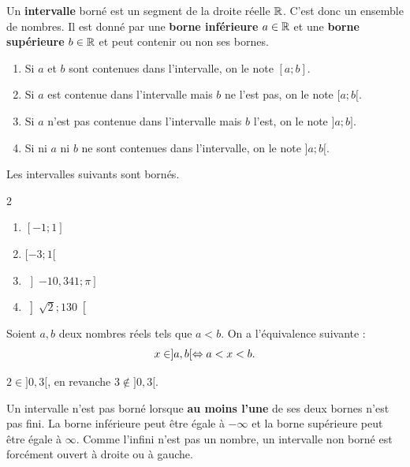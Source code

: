 \documentclass[a4paper, 12pt]{report}
\begin{document}
\begin{defn}
	Un \textbf{intervalle} borné est un segment de la droite réelle $\mathbb{R}$. C'est donc un ensemble de nombres.
	Il est donné par une \textbf{borne inférieure} $a \in \mathbb{R}$ et une \textbf{borne supérieure} $b\in\mathbb{R}$ et peut contenir ou non ses bornes.
	
	\begin{enumerate}
		\item Si $a$ et $b$ sont contenues dans l'intervalle, on le note $[a ; b]$.
		\item Si $a$  est contenue dans l'intervalle mais $b$ ne l'est pas, on le note $[a ; b [$.
		\item Si $a$ n'est pas contenue dans l'intervalle mais $b$ l'est, on le note $] a ; b]$.
		\item Si ni $a$ ni $b$ ne sont contenues dans l'intervalle, on le note $] a ; b [$.
	\end{enumerate}
\end{defn}

\begin{ex}
Les intervalles suivants sont bornés.
	\begin{multicols}{2}
	\begin{enumerate}[label=$\bullet$]
		\item $[-1 ; 1]$
		\item $[-3 ; 1[$
		\item $\left]-10{,}341 ; \pi\right]$
		\item $\left]\sqrt{2} ; 130\right[$
	\end{enumerate}
	\end{multicols}
\end{ex}

\begin{prop}
Soient $a,b$ deux nombres réels tels que $a<b$. On a l'équivalence suivante :
\[ x \in ]a,b[ \Leftrightarrow a < x < b. \]
\end{prop}

\begin{ex}
$2 \in ]0,3[$, en revanche $3 \not \in ]0,3[$.
\end{ex}  

\begin{defn}
	Un intervalle n'est pas borné lorsque \textbf{au moins l'une} de ses deux bornes n'est pas fini.
	La borne inférieure peut être égale à $-\infty$ et la borne supérieure peut être égale à $\infty$.
	Comme l'infini n'est pas un nombre, un intervalle non borné est forcément ouvert à droite ou à gauche.
\end{defn}
\end{document}
